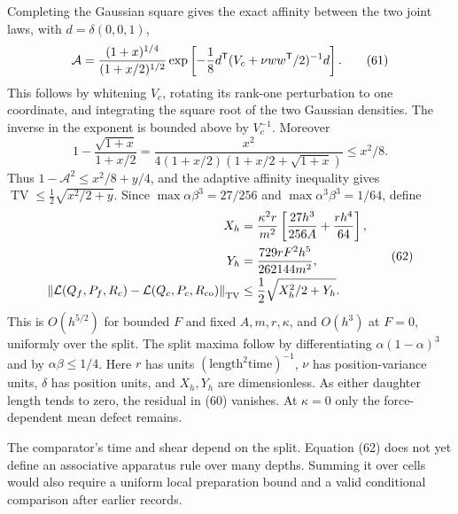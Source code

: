\documentclass[11pt,a4paper]{article}
\begin{document}
Completing the Gaussian square gives the exact affinity between the two
joint laws, with \(d=\delta(0,0,1)\), \[\mathcal A
=\frac{(1+x)^{1/4}}{(1+x/2)^{1/2}}
 \exp\left[-\frac18d^{\sf T}
       (V_c+\nu ww^{\sf T}/2)^{-1}d\right].\tag{61}\] This follows by
whitening \(V_c\), rotating its rank-one perturbation to one coordinate,
and integrating the square root of the two Gaussian densities. The
inverse in the exponent is bounded above by \(V_c^{-1}\). Moreover
\[1-\frac{\sqrt{1+x}}{1+x/2}
=\frac{x^2}{4(1+x/2)(1+x/2+\sqrt{1+x})}\le x^2/8.\] Thus
\(1-\mathcal A^2\le x^2/8+y/4\), and the adaptive affinity inequality
gives \(\operatorname{TV}\le\frac12\sqrt{x^2/2+y}\). Since
\(\max\alpha\beta^3=27/256\) and \(\max\alpha^3\beta^3=1/64\), define
\[\begin{aligned}
X_h&=\frac{\kappa^2r}{m^2}
       \left[\frac{27h^3}{256A}+\frac{rh^4}{64}\right],\\
Y_h&=\frac{729rF^2h^5}{262144m^2},\\
\left\|\mathcal L(Q_f,P_f,R_c)
       -\mathcal L(Q_c,P_c,R_{\rm co})\right\|_{\rm TV}
 &\le\frac12\sqrt{X_h^2/2+Y_h}.
\end{aligned}\tag{62}\] This is \(O(h^{5/2})\) for bounded \(F\) and
fixed \(A,m,r,\kappa\), and \(O(h^3)\) at \(F=0\), uniformly over the
split. The split maxima follow by differentiating \(\alpha(1-\alpha)^3\)
and by \(\alpha\beta\le1/4\). Here \(r\) has units
\((\text{length}^2\text{time})^{-1}\), \(\nu\) has position-variance
units, \(\delta\) has position units, and \(X_h,Y_h\) are dimensionless.
As either daughter length tends to zero, the residual in (60) vanishes.
At \(\kappa=0\) only the force-dependent mean defect remains.

The comparator's time and shear depend on the split. Equation (62) does
not yet define an associative apparatus rule over many depths. Summing
it over cells would also require a uniform local preparation bound and a
valid conditional comparison after earlier records.
\end{document}
